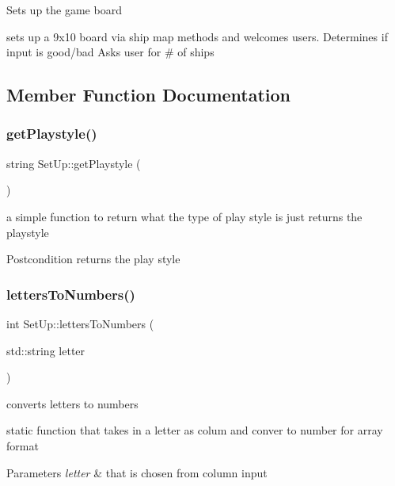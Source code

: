 Sets up the game board

sets up a 9x10 board via ship map methods and welcomes users. Determines if input is good/bad Asks user for \# of ships 

\subsection{Member Function Documentation}
\mbox{\label{classSetUp_ac97974e28cc81cbc42d8b2f91df87c37}} 
\subsubsection{\texorpdfstring{get\+Playstyle()}{getPlaystyle()}}
{\footnotesize\ttfamily string Set\+Up\+::get\+Playstyle (\begin{DoxyParamCaption}{ }\end{DoxyParamCaption})}

a simple function to return what the type of play style is just returns the playstyle \begin{DoxyPostcond}{Postcondition}
returns the play style 
\end{DoxyPostcond}
\mbox{\label{classSetUp_a8f7d45dcde5df9f7f421a1193f3a9836}} 
\subsubsection{\texorpdfstring{letters\+To\+Numbers()}{lettersToNumbers()}}
{\footnotesize\ttfamily int Set\+Up\+::letters\+To\+Numbers (\begin{DoxyParamCaption}\item[{std\+::string}]{letter }\end{DoxyParamCaption})\hspace{0.3cm}{\ttfamily [static]}}

converts letters to numbers

static function that takes in a letter as colum and conver to number for array format 
\begin{DoxyParams}{Parameters}
{\em letter} & that is chosen from column input \\
\hline
\end{DoxyParams}
\mbox{\label{classSetUp_af5bb381f047ec77aba1b3cb51c403244}} 
